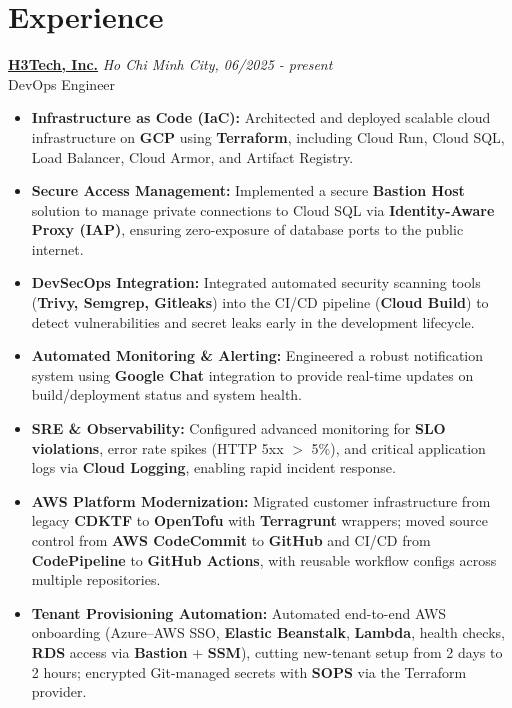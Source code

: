 \documentclass[a4paper,10pt]{article}
\begin{document}
\vspace{10pt}
\section*{Experience}
\noindent \textbf{\href{https://www.linkedin.com/company/h3tech/posts/?feedView=all}{H3Tech, Inc.}} \hfill \textit{Ho Chi Minh City, 06/2025 - present}  \\
DevOps Engineer \\
\begin{itemize}[leftmargin=*, itemsep=2pt]
    \item \textbf{Infrastructure as Code (IaC):} Architected and deployed scalable cloud infrastructure on \textbf{GCP} using \textbf{Terraform}, including Cloud Run, Cloud SQL, Load Balancer, Cloud Armor, and Artifact Registry.
    \item \textbf{Secure Access Management:} Implemented a secure \textbf{Bastion Host} solution to manage private connections to Cloud SQL via \textbf{Identity-Aware Proxy (IAP)}, ensuring zero-exposure of database ports to the public internet.
    \item \textbf{DevSecOps Integration:} Integrated automated security scanning tools (\textbf{Trivy, Semgrep, Gitleaks}) into the CI/CD pipeline (\textbf{Cloud Build}) to detect vulnerabilities and secret leaks early in the development lifecycle.
    \item \textbf{Automated Monitoring \& Alerting:} Engineered a robust notification system using \textbf{Google Chat} integration to provide real-time updates on build/deployment status and system health.
    \item \textbf{SRE \& Observability:} Configured advanced monitoring for \textbf{SLO violations}, error rate spikes (HTTP 5xx $>$ 5\%), and critical application logs via \textbf{Cloud Logging}, enabling rapid incident response.
    \item \textbf{AWS Platform Modernization:} Migrated customer infrastructure from legacy \textbf{CDKTF} to \textbf{OpenTofu} with \textbf{Terragrunt} wrappers; moved source control from \textbf{AWS CodeCommit} to \textbf{GitHub} and CI/CD from \textbf{CodePipeline} to \textbf{GitHub Actions}, with reusable workflow configs across multiple repositories.
    \item \textbf{Tenant Provisioning Automation:} Automated end-to-end AWS onboarding (Azure--AWS SSO, \textbf{Elastic Beanstalk}, \textbf{Lambda}, health checks, \textbf{RDS} access via \textbf{Bastion} + \textbf{SSM}), cutting new-tenant setup from 2 days to 2 hours; encrypted Git-managed secrets with \textbf{SOPS} via the Terraform provider.

\end{itemize}
\end{document}
